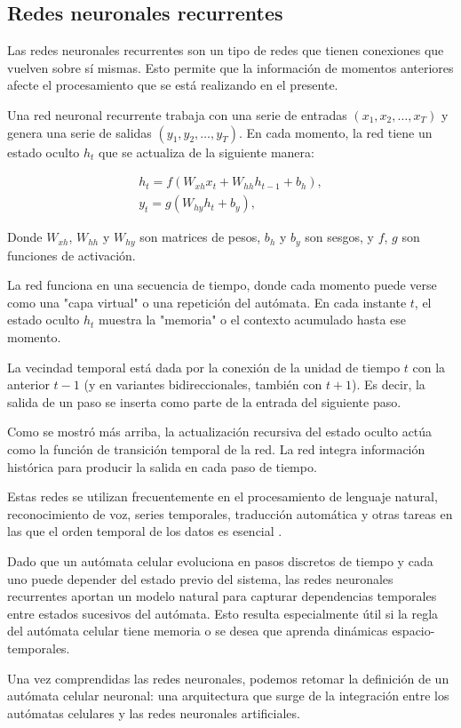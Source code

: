 \subsection{Redes neuronales recurrentes}

Las redes neuronales recurrentes son un tipo de redes que tienen conexiones que vuelven sobre sí mismas. Esto permite que la información de momentos anteriores afecte el procesamiento que se está realizando en el presente.

Una red neuronal recurrente trabaja con una serie de entradas $(x_1, x_2, \dots, x_T)$ y genera una serie de salidas $(y_1, y_2, \dots, y_T)$. En cada momento, la red tiene un estado oculto $h_t$ que se actualiza de la siguiente manera:

\begin{gather*}
	h_t = f(W_{xh} x_t + W_{hh} h_{t-1} + b_h), \\
	y_t = g(W_{hy} h_t + b_y),
\end{gather*}

Donde $W_{xh}$, $W_{hh}$ y $W_{hy}$ son matrices de pesos, $b_h$ y $b_y$ son sesgos, y $f$, $g$ son funciones de activación.

La red funciona en una secuencia de tiempo, donde cada momento puede verse como una "capa virtual" o una repetición del autómata. En cada instante $t$, el estado oculto $h_t$ muestra la "memoria" o el contexto acumulado hasta ese momento.

La vecindad temporal está dada por la conexión de la unidad de tiempo $t$ con la anterior $t-1$ (y en variantes bidireccionales, también con $t+1$). Es decir, la salida de un paso se inserta como parte de la entrada del siguiente paso.

Como se mostró más arriba, la actualización recursiva del estado oculto actúa como la función de transición temporal de la red. La red integra información histórica para producir la salida en cada paso de tiempo.

Estas redes se utilizan frecuentemente en el procesamiento de lenguaje natural, reconocimiento de voz, series temporales, traducción automática y otras tareas en las que el orden temporal de los datos es esencial \cite{rnn}.

Dado que un autómata celular evoluciona en pasos discretos de tiempo y cada uno puede depender del estado previo del sistema, las redes neuronales recurrentes aportan un modelo natural para capturar dependencias temporales entre estados sucesivos del autómata. Esto resulta especialmente útil si la regla del autómata celular tiene memoria o se desea que aprenda dinámicas espacio-temporales.


Una vez comprendidas las redes neuronales, podemos retomar la definición de un autómata celular neuronal: una arquitectura que surge de la integración entre los autómatas celulares y las redes neuronales artificiales.



\clearpage